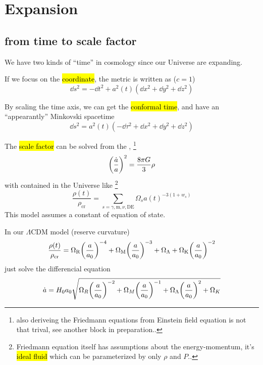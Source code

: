 
\section{Expansion}

\subsection{from time to scale factor}

We have two kinds of ``time'' in cosmology since our Universe are expanding. 

If we focus on the \hl{coordinate}, the metric is written as ($c=1$)
\begin{equation}
    \dd s^2 = -\dd t^2 + a^2(t) (\dd x^2 + \dd y^2 + \dd z^2)
\end{equation}

By scaling the time axis, we can get the \hl{conformal time}, 
and have an ``appearantly'' Minkovski spacetime
\begin{equation}
    \dd s^2 = a^2(t) (-\dd \tau^2 + \dd x^2 + \dd y^2 + \dd z^2)
\end{equation}

The \hl{scale factor} can be solved from the , 
\footnote{also deriveing the Friedmann equations from Einstein field equation is not that trival, see another block in preparation..}
\begin{equation}  \label{eq:Friedmann1}
    {\qty(\frac{\dot{a}}{a})}^2 = \frac{8\pi G}{3} \rho
\end{equation}
with  contained in the Universe like 
\footnote{Friedmann equation itself has assumptions about the energy-momentum, it's \hl{ideal fluid} which can be parameterized by only $\rho$ and $P$..}
\begin{equation}
    \frac{\rho(t)}{\rho_{\mathrm{cr}}} = \sum_{s=\gamma, \mathrm{m}, \nu, \mathrm{DE}} \Omega_{s} {a(t)}^{-3 (1 + w_{s})} 
\end{equation}
This model assumes a constant of equation of state. 


In our $\Lambda$CDM model (reserve curvature)
\begin{equation} \label{eq:LCDM}
    \frac{\rho(t)}{\rho_{\mathrm{cr}}} = \Omega_{\mathrm{R}} {\qty(\frac{a}{a_0})}^{-4} + \Omega_{\mathrm{M}} {\qty(\frac{a}{a_0})}^{-3} + \Omega_\Lambda + \Omega_{\mathrm{K}} {\qty(\frac{a}{a_0})}^{-2}
\end{equation}
just solve the differencial equation
\begin{equation}
    \dot{a} = H_0 a_0 \sqrt{\Omega_R {\qty(\frac{a}{a_0})}^{-2} + \Omega_M {\qty(\frac{a}{a_0})}^{-1} + \Omega_\Lambda{\qty(\frac{a}{a_0})}^{2} + \Omega_K}
\end{equation}

